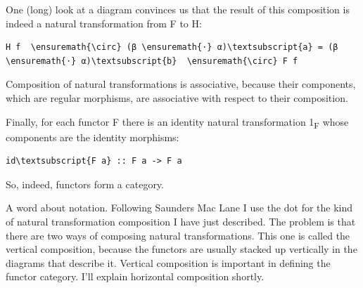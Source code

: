 \noindent
One (long) look at a diagram convinces us that the result of this
composition is indeed a natural transformation from F to H:

\begin{Verbatim}[commandchars=\\\{\}]
H f  \ensuremath{\circ} (β \ensuremath{⋅} α)\textsubscript{a} = (β \ensuremath{⋅} α)\textsubscript{b}  \ensuremath{\circ} F f
\end{Verbatim}

\begin{figure}[H]
\centering
{}
\end{figure}

\noindent
Composition of natural transformations is associative, because their
components, which are regular morphisms, are associative with respect to
their composition.

Finally, for each functor F there is an identity natural transformation
1\textsubscript{F} whose components are the identity morphisms:

\begin{Verbatim}[commandchars=\\\{\}]
id\textsubscript{F a} :: F a -> F a
\end{Verbatim}
So, indeed, functors form a category.

A word about notation. Following Saunders Mac Lane I use the dot for the
kind of natural transformation composition I have just described. The
problem is that there are two ways of composing natural transformations.
This one is called the vertical composition, because the functors are
usually stacked up vertically in the diagrams that describe it. Vertical
composition is important in defining the functor category. I'll explain
horizontal composition shortly.

\begin{figure}
\centering
{}
\end{figure}

